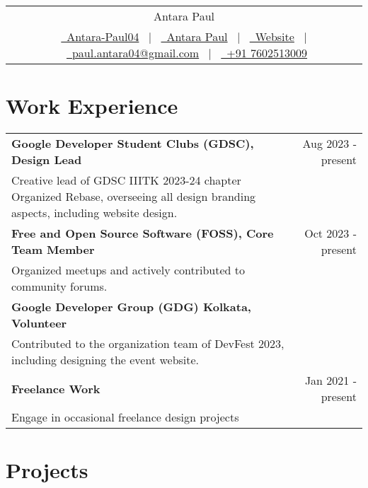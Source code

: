 \documentclass{article}
\begin{document}
\begin{tabularx}{\linewidth}{@{} C @{}}
\Huge{Antara Paul}\\[7.5pt]
\href{https://github.com/Antara-Paul04}{\raisebox{-0.05\height}{\faGithub}\ Antara-Paul04} \ $|$ \ 
\href{https://www.linkedin.com/in/antara-paul-069a37271/}{\raisebox{-0.05\height}{\faLinkedin}\ Antara Paul} \ $|$ \ 
\href{https://antara-paul04.github.io/Antara---Portfolio/}{\raisebox{-0.05\height}{\faGlobe}\ Website} \ $|$ \ 
\href{mailto:paul.antara04@gmail.com}{\raisebox{-0.05\height}{\faEnvelope}\ paul.antara04@gmail.com} \ $|$ \ 
\href{tel:+000000000000}{\raisebox{-0.05\height}{\faMobile}\ +91 7602513009}\\
\end{tabularx}


\section{Work Experience}

\begin{tabularx}{\linewidth}{ @{}l r@{} }
\textbf{Google Developer Student Clubs (GDSC), Design Lead} & \hfill Aug 2023 - present \\[3.5pt]
Creative lead of GDSC IIITK 2023-24 chapter
Organized Rebase, overseeing all design branding aspects, including website design. \\[4pt]
\textbf{Free and Open Source Software (FOSS), Core Team Member} & \hfill Oct 2023 - present \\[3.5pt]
Organized meetups and actively contributed to community forums. \\[4pt]
\textbf{Google Developer Group (GDG) Kolkata, Volunteer} & \\[3.5pt]
Contributed to the organization team of DevFest 2023, including designing the event website. \\[4pt]
\textbf{Freelance Work} & \hfill Jan 2021 - present \\[3.5pt]
Engage in occasional freelance design projects \\
\end{tabularx}

\section{Projects}
\end{document}
